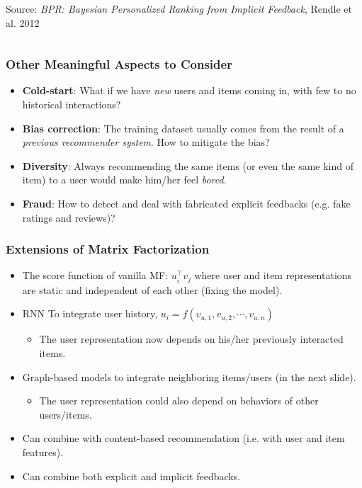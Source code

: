 \documentclass[11pt,aspectratio=169]{beamer}
\begin{document}
\begin{frame}
\begin{columns}
\begin{column}{0.4\textwidth}
\begin{center}
					{\tiny Source: \textit{BPR: Bayesian Personalized Ranking from Implicit Feedback}, Rendle et al. 2012}
				\end{center}
			\end{column}
		\end{columns}
	\end{frame}

	\begin{frame}
		\frametitle{Other Meaningful Aspects to Consider}
		\begin{itemize}
			\item \textbf{Cold-start}: What if we have \textit{new} users and items coming in, with few to no historical interactions? \pause
			\item \textbf{Bias correction}: The training dataset usually comes from the result of a \textit{previous recommender system}.  How to mitigate the bias? \pause
			\item \textbf{Diversity}: Always recommending the same items (or even the same kind of item) to a user would make him/her feel \textit{bored}. \pause
			\item \textbf{Fraud}: How to detect and deal with fabricated explicit feedbacks (e.g. fake ratings and reviews)?
		\end{itemize}
	\end{frame}

	\begin{frame}
		\frametitle{Extensions of Matrix Factorization}
		\begin{itemize}
			\item The score function of vanilla MF: $u_i^\top v_j$ where user and item representations are static and independent of each other (fixing the model).
			\item RNN To integrate user history, $u_i = f(v_{u, 1}, v_{u, 2}, \cdots, v_{u, n})$
			\begin{itemize}
				\item The user representation now depends on his/her previously interacted items.
			\end{itemize}
			\item Graph-based models to integrate neighboring items/users (in the next slide).
			\begin{itemize}
				\item The user representation could also depend on behaviors of other users/items.
			\end{itemize}
			\item Can combine with content-based recommendation (i.e. with user and item features).
			\item Can combine both explicit and implicit feedbacks.
		\end{itemize}
	\end{frame}
\end{document}
